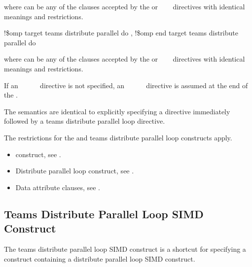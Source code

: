 where  can be any of the clauses accepted by the  or
~~~ directives with identical 
meanings and restrictions.
\ccppspecificend

\begin{samepage}
\fortranspecificstart
\begin{boxedcode}
!\$omp target teams distribute parallel do \plc{[clause[ [},\plc{] clause] ... ]}
\plc{[}!\$omp end target teams distribute parallel do\plc{]}
\end{boxedcode}
\end{samepage}

where  can be any of the clauses accepted by the  or 
~~~ directives with identical 
meanings and restrictions.

If an ~~~~~ directive is not specified, an 
~~~~~ directive is assumed at the end of 
the .
\fortranspecificend

\descr
The semantics are identical to explicitly specifying a  directive immediately 
followed by a teams distribute parallel loop directive.

\restrictions
The restrictions for the  and teams distribute parallel loop constructs apply.

\crossreferences
\begin{itemize}
\item {} construct, see 
.

\item Distribute parallel loop construct, see 
.

\item Data attribute clauses, see 
.
\end{itemize}










\subsection{Teams Distribute Parallel Loop SIMD Construct}
\label{subsec:Teams Distribute Parallel Loop SIMD Construct}
\summary
The teams distribute parallel loop SIMD construct is a shortcut for specifying a  
construct containing a distribute parallel loop SIMD construct.

